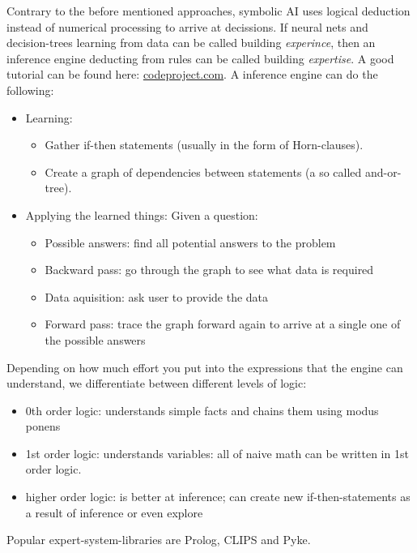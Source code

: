 Contrary to the before mentioned approaches, symbolic AI uses logical deduction instead of numerical processing to arrive at decissions. If neural nets and decision-trees learning from data can be called building \emph{experince}, then an inference engine deducting from rules can be called building \emph{expertise}. A good tutorial can be found here: \href{codeproject.com/Articles/179375/Man-Marriage-and-Machine-Adventures-in-Artificia}{codeproject.com}.
A inference engine can do the following: 
\begin{itemize}
	\item Learning: 
		\begin{itemize}
			\item Gather if-then statements (usually in the form of Horn-clauses).
			\item Create a graph of dependencies between statements (a so called and-or-tree).
		\end{itemize}
	\item Applying the learned things: Given a question: 
		\begin{itemize}
			\item Possible answers: find all potential answers to the problem
			\item Backward pass: go through the graph to see what data is required
			\item Data aquisition: ask user to provide the data
			\item Forward pass: trace the graph forward again to arrive at a single one of the possible answers
		\end{itemize}
\end{itemize}

Depending on how much effort you put into the expressions that the engine can understand, we differentiate between different levels of logic: 
\begin{itemize}
    \item 0th order logic: understands simple facts and chains them using modus ponens
    \item 1st order logic: understands variables: all of naive math can be written in 1st order logic.
    \item higher order logic: is better at inference; can create new if-then-statements as a result of inference or even explore
\end{itemize}

Popular expert-system-libraries are Prolog, CLIPS and Pyke.

